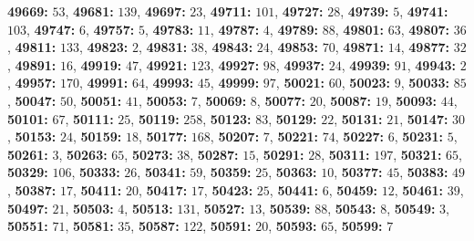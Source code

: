 \textsf{\bfseries 49669:} $53$, \textsf{\bfseries 49681:} $139$, \textsf{\bfseries 49697:} $23$, \textsf{\bfseries 49711:} $101$, \textsf{\bfseries 49727:} $28$, \textsf{\bfseries 49739:} $5$, \textsf{\bfseries 49741:} $103$, \textsf{\bfseries 49747:} $6$, \textsf{\bfseries 49757:} $5$, \textsf{\bfseries 49783:} $11$, \textsf{\bfseries 49787:} $4$, \textsf{\bfseries 49789:} $88$, \textsf{\bfseries 49801:} $63$, \textsf{\bfseries 49807:} $36$, \textsf{\bfseries 49811:} $133$, \textsf{\bfseries 49823:} $2$, \textsf{\bfseries 49831:} $38$, \textsf{\bfseries 49843:} $24$, \textsf{\bfseries 49853:} $70$, \textsf{\bfseries 49871:} $14$, \textsf{\bfseries 49877:} $32$, \textsf{\bfseries 49891:} $16$, \textsf{\bfseries 49919:} $47$, \textsf{\bfseries 49921:} $123$, \textsf{\bfseries 49927:} $98$, \textsf{\bfseries 49937:} $24$, \textsf{\bfseries 49939:} $91$, \textsf{\bfseries 49943:} $2$, \textsf{\bfseries 49957:} $170$, \textsf{\bfseries 49991:} $64$, \textsf{\bfseries 49993:} $45$, \textsf{\bfseries 49999:} $97$, \textsf{\bfseries 50021:} $60$, \textsf{\bfseries 50023:} $9$, \textsf{\bfseries 50033:} $85$, \textsf{\bfseries 50047:} $50$, \textsf{\bfseries 50051:} $41$, \textsf{\bfseries 50053:} $7$, \textsf{\bfseries 50069:} $8$, \textsf{\bfseries 50077:} $20$, \textsf{\bfseries 50087:} $19$, \textsf{\bfseries 50093:} $44$, \textsf{\bfseries 50101:} $67$, \textsf{\bfseries 50111:} $25$, \textsf{\bfseries 50119:} $258$, \textsf{\bfseries 50123:} $83$, \textsf{\bfseries 50129:} $22$, \textsf{\bfseries 50131:} $21$, \textsf{\bfseries 50147:} $30$, \textsf{\bfseries 50153:} $24$, \textsf{\bfseries 50159:} $18$, \textsf{\bfseries 50177:} $168$, \textsf{\bfseries 50207:} $7$, \textsf{\bfseries 50221:} $74$, \textsf{\bfseries 50227:} $6$, \textsf{\bfseries 50231:} $5$, \textsf{\bfseries 50261:} $3$, \textsf{\bfseries 50263:} $65$, \textsf{\bfseries 50273:} $38$, \textsf{\bfseries 50287:} $15$, \textsf{\bfseries 50291:} $28$, \textsf{\bfseries 50311:} $197$, \textsf{\bfseries 50321:} $65$, \textsf{\bfseries 50329:} $106$, \textsf{\bfseries 50333:} $26$, \textsf{\bfseries 50341:} $59$, \textsf{\bfseries 50359:} $25$, \textsf{\bfseries 50363:} $10$, \textsf{\bfseries 50377:} $45$, \textsf{\bfseries 50383:} $49$, \textsf{\bfseries 50387:} $17$, \textsf{\bfseries 50411:} $20$, \textsf{\bfseries 50417:} $17$, \textsf{\bfseries 50423:} $25$, \textsf{\bfseries 50441:} $6$, \textsf{\bfseries 50459:} $12$, \textsf{\bfseries 50461:} $39$, \textsf{\bfseries 50497:} $21$, \textsf{\bfseries 50503:} $4$, \textsf{\bfseries 50513:} $131$, \textsf{\bfseries 50527:} $13$, \textsf{\bfseries 50539:} $88$, \textsf{\bfseries 50543:} $8$, \textsf{\bfseries 50549:} $3$, \textsf{\bfseries 50551:} $71$, \textsf{\bfseries 50581:} $35$, \textsf{\bfseries 50587:} $122$, \textsf{\bfseries 50591:} $20$, \textsf{\bfseries 50593:} $65$, \textsf{\bfseries 50599:} $7$